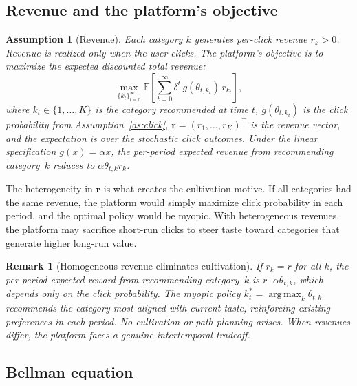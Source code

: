 \documentclass[11pt]{article}
\newtheorem{assumption}{Assumption}
\newtheorem{remark}{Remark}
\DeclareMathOperator*{\argmax}{arg\,max}
\newcommand{\E}{\mathbb{E}}
\begin{document}
\subsection{Revenue and the platform's objective}

\begin{assumption}[Revenue]\label{as:revenue}
Each category $k$ generates per-click revenue $r_k > 0$. Revenue is realized only when the user clicks. The platform's objective is to maximize the expected discounted total revenue:
\begin{equation}\label{eq:objective}
\max_{\{k_t\}_{t=0}^{\infty}} \E \left[ \sum_{t=0}^{\infty} \delta^t \, g(\theta_{t,k_t}) \, r_{k_t} \right],
\end{equation}
where $k_t \in \{1, \ldots, K\}$ is the category recommended at time $t$, $g(\theta_{t,k_t})$ is the click probability from Assumption~\ref{as:click}, $\mathbf{r} = (r_1, \ldots, r_K)^\top$ is the revenue vector, and the expectation is over the stochastic click outcomes. Under the linear specification $g(x) = \alpha x$, the per-period expected revenue from recommending category~$k$ reduces to $\alpha \theta_{t,k} r_k$.
\end{assumption}

The heterogeneity in $\mathbf{r}$ is what creates the cultivation motive. If all categories had the same revenue, the platform would simply maximize click probability in each period, and the optimal policy would be myopic. With heterogeneous revenues, the platform may sacrifice short-run clicks to steer taste toward categories that generate higher long-run value.

\begin{remark}[Homogeneous revenue eliminates cultivation]\label{rem:homogeneous}
If $r_k = r$ for all $k$, the per-period expected reward from recommending category~$k$ is $r \cdot \alpha \theta_{t,k}$, which depends only on the click probability. The myopic policy $k_t^* = \argmax_{k} \theta_{t,k}$ recommends the category most aligned with current taste, reinforcing existing preferences in each period. No cultivation or path planning arises. When revenues differ, the platform faces a genuine intertemporal tradeoff.
\end{remark}

\subsection{Bellman equation}
\end{document}
